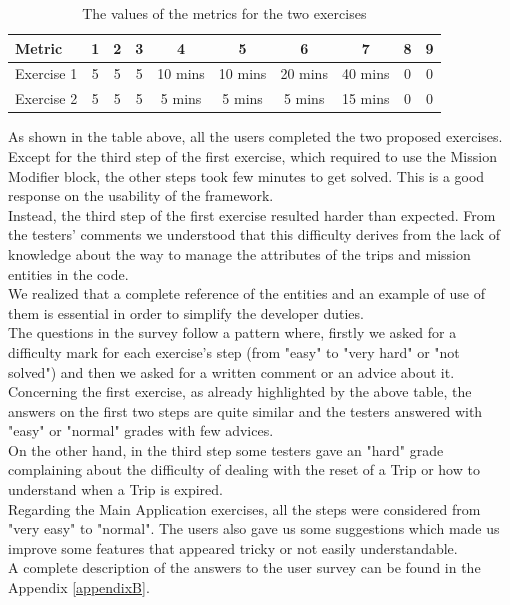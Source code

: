 \begin{table} [htdp]
\centering
\caption{The values of the metrics for the two exercises}
\label{surveyTable}
    \begin{tabular}{|l|c|c|c|c|c|c|c|c|c|}
    \hline
    Metric & 1 & 2 & 3 &  4 &  5 & 6 &  7 & 8 & 9\\ \hline
    Exercise 1 & 5 & 5 & 5 & 10 mins & 10 mins & 20 mins & 40 mins & 0 & 0 \\ \hline
    Exercise 2 & 5 & 5 & 5 & 5 mins & 5 mins & 5 mins & 15 mins & 0 & 0
     \\ \hline
     \end{tabular}
    \end{table}

As shown in the table above, all the users completed the two proposed exercises.
Except for the third step of the first exercise, which required to use the Mission Modifier block, the other steps took few minutes to get solved.
This is a good response on the usability of the framework.
\\
Instead, the third step of the first exercise resulted harder than expected. 
From the testers' comments we understood that this difficulty derives from the lack of knowledge about the way to manage the attributes of the trips and mission entities in the code.
\\
We realized that a complete reference of the entities and an example of use of them is essential in order to simplify the developer duties.
\\

The questions in the survey follow a pattern where, firstly we asked for a difficulty mark for each exercise's step (from "easy" to "very hard" or "not solved") and then we asked for a written comment or an advice about it.
\\
Concerning the first exercise, as already highlighted by the above table, the answers on the first two steps are quite similar and the testers answered with "easy" or "normal" grades with few advices.
\\
On the other hand, in the third step some testers gave an "hard" grade complaining about the difficulty of dealing with the reset of a Trip or how to understand when a Trip is expired.
\\

Regarding the Main Application exercises, all the steps were considered from "very easy" to "normal". 
The users also gave us some suggestions which made us improve some features that appeared tricky or not easily understandable.
\\
A complete description of the answers to the user survey can be found in the Appendix \ref{appendixB}.
\\

